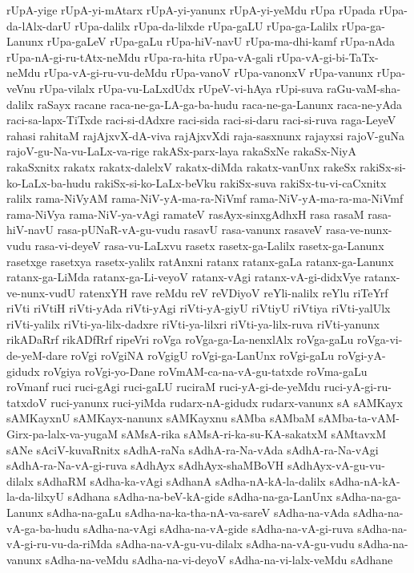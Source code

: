 {rUpA-yige
rUpA-yi-mAtarx
rUpA-yi-yanunx
rUpA-yi-yeMdu
rUpa
rUpada
rUpa-da-lAlx-darU
rUpa-dalilx
rUpa-da-lilxde
rUpa-gaLU
rUpa-ga-Lalilx
rUpa-ga-Lanunx
rUpa-gaLeV
rUpa-gaLu
rUpa-hiV-navU
rUpa-ma-dhi-kamf
rUpa-nAda
rUpa-nA-gi-ru-tAtx-neMdu
rUpa-ra-hita
rUpa-vA-gali
rUpa-vA-gi-bi-TaTx-neMdu
rUpa-vA-gi-ru-vu-deMdu
rUpa-vanoV
rUpa-vanonxV
rUpa-vanunx
rUpa-veVnu
rUpa-vilalx
rUpa-vu-LaLxdUdx
rUpeV-vi-hAya
rUpi-suva
raGu-vaM-sha-dalilx
raSayx
racane
raca-ne-ga-LA-ga-ba-hudu
raca-ne-ga-Lanunx
raca-ne-yAda
raci-sa-lapx-TiTxde
raci-si-dAdxre
raci-sida
raci-si-daru
raci-si-ruva
raga-LeyeV
rahasi
rahitaM
rajAjxvX-dA-viva
rajAjxvXdi
raja-sasxnunx
rajayxsi
rajoV-guNa
rajoV-gu-Na-vu-LaLx-va-rige
rakASx-parx-laya
rakaSxNe
rakaSx-NiyA
rakaSxnitx
rakatx
rakatx-dalelxV
rakatx-diMda
rakatx-vanUnx
rakeSx
rakiSx-si-ko-LaLx-ba-hudu
rakiSx-si-ko-LaLx-beVku
rakiSx-suva
rakiSx-tu-vi-caCxnitx
ralilx
rama-NiVyAM
rama-NiV-yA-ma-ra-NiVmf
rama-NiV-yA-ma-ra-ma-NiVmf
rama-NiVya
rama-NiV-ya-vAgi
ramateV
rasAyx-sinxgAdhxH
rasa
rasaM
rasa-hiV-navU
rasa-pUNaR-vA-gu-vudu
rasavU
rasa-vanunx
rasaveV
rasa-ve-nunx-vudu
rasa-vi-deyeV
rasa-vu-LaLxvu
rasetx
rasetx-ga-Lalilx
rasetx-ga-Lanunx
rasetxge
rasetxya
rasetx-yalilx
ratAnxni
ratanx
ratanx-gaLa
ratanx-ga-Lanunx
ratanx-ga-LiMda
ratanx-ga-Li-veyoV
ratanx-vAgi
ratanx-vA-gi-didxVye
ratanx-ve-nunx-vudU
ratenxYH
rave
reMdu
reV
reVDiyoV
reYli-nalilx
reYlu
riTeYrf
riVti
riVtiH
riVti-yAda
riVti-yAgi
riVti-yA-giyU
riVtiyU
riVtiya
riVti-yalUlx
riVti-yalilx
riVti-ya-lilx-dadxre
riVti-ya-lilxri
riVti-ya-lilx-ruva
riVti-yanunx
rikADaRrf
rikADfRrf
ripeVri
roVga
roVga-ga-La-nenxlAlx
roVga-gaLu
roVga-vi-de-yeM-dare
roVgi
roVgiNA
roVgigU
roVgi-ga-LanUnx
roVgi-gaLu
roVgi-yA-gidudx
roVgiya
roVgi-yo-Dane
roVmAM-ca-na-vA-gu-tatxde
roVma-gaLu
roVmanf
ruci
ruci-gAgi
ruci-gaLU
ruciraM
ruci-yA-gi-de-yeMdu
ruci-yA-gi-ru-tatxdoV
ruci-yanunx
ruci-yiMda
rudarx-nA-gidudx
rudarx-vanunx
sA
sAMKayx
sAMKayxnU
sAMKayx-nanunx
sAMKayxnu
sAMba
sAMbaM
sAMba-ta-vAM-Girx-pa-lalx-va-yugaM
sAMsA-rika
sAMsA-ri-ka-su-KA-sakatxM
sAMtavxM
sANe
sAciV-kuvaRnitx
sAdhA-raNa
sAdhA-ra-Na-vAda
sAdhA-ra-Na-vAgi
sAdhA-ra-Na-vA-gi-ruva
sAdhAyx
sAdhAyx-shaMBoVH
sAdhAyx-vA-gu-vu-dilalx
sAdhaRM
sAdha-ka-vAgi
sAdhanA
sAdha-nA-kA-la-dalilx
sAdha-nA-kA-la-da-lilxyU
sAdhana
sAdha-na-beV-kA-gide
sAdha-na-ga-LanUnx
sAdha-na-ga-Lanunx
sAdha-na-gaLu
sAdha-na-ka-tha-nA-va-sareV
sAdha-na-vAda
sAdha-na-vA-ga-ba-hudu
sAdha-na-vAgi
sAdha-na-vA-gide
sAdha-na-vA-gi-ruva
sAdha-na-vA-gi-ru-vu-da-riMda
sAdha-na-vA-gu-vu-dilalx
sAdha-na-vA-gu-vudu
sAdha-na-vanunx
sAdha-na-veMdu
sAdha-na-vi-deyoV
sAdha-na-vi-lalx-veMdu
sAdhane
}
